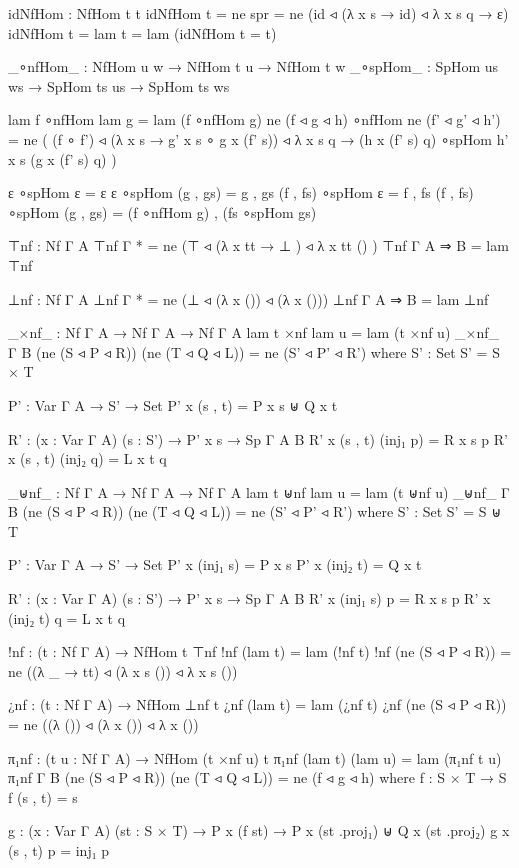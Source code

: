 \begin{code}
idNfHom : NfHom t t
idNfHom {t = ne spr} = ne (id ◃ (λ x s → id) ◃ λ x s q → ε)
idNfHom {t = lam t} = lam (idNfHom {t = t})

_∘nfHom_ : NfHom u w → NfHom t u → NfHom t w
_∘spHom_ : SpHom us ws → SpHom ts us → SpHom ts ws

lam f ∘nfHom lam g = lam (f ∘nfHom g)
ne (f ◃ g ◃ h) ∘nfHom ne (f' ◃ g' ◃ h') = ne (
  (f ∘ f')
  ◃ (λ x s → g' x s ∘ g x (f' s))
  ◃ λ x s q → (h x (f' s) q) ∘spHom h' x s (g x (f' s) q)
  )

ε ∘spHom ε = ε
ε ∘spHom (g , gs) = g , gs
(f , fs) ∘spHom ε = f , fs
(f , fs) ∘spHom (g , gs) = (f ∘nfHom g) , (fs ∘spHom gs)

⊤nf : Nf Γ A
⊤nf {Γ} {*} = ne (⊤ ◃ (λ{ x tt → ⊥ }) ◃ λ{ x tt () })
⊤nf {Γ} {A ⇒ B} = lam ⊤nf

⊥nf : Nf Γ A
⊥nf {Γ} {*} = ne (⊥ ◃ (λ x ()) ◃ (λ x ()))
⊥nf {Γ} {A ⇒ B} = lam ⊥nf

_×nf_ : Nf Γ A → Nf Γ A → Nf Γ A
lam t ×nf lam u = lam (t ×nf u)
_×nf_ {Γ} {B} (ne (S ◃ P ◃ R)) (ne (T ◃ Q ◃ L)) = ne (S' ◃ P' ◃ R')
  where
  S' : Set
  S' = S × T

  P' : Var Γ A → S' → Set
  P' x (s , t) = P x s ⊎ Q x t

  R' : (x : Var Γ A) (s : S') → P' x s → Sp Γ A B
  R' x (s , t) (inj₁ p) = R x s p
  R' x (s , t) (inj₂ q) = L x t q

_⊎nf_ : Nf Γ A → Nf Γ A → Nf Γ A
lam t ⊎nf lam u = lam (t ⊎nf u)
_⊎nf_ {Γ} {B} (ne (S ◃ P ◃ R)) (ne (T ◃ Q ◃ L)) = ne (S' ◃ P' ◃ R')
  where
  S' : Set
  S' = S ⊎ T

  P' : Var Γ A → S' → Set
  P' x (inj₁ s) = P x s
  P' x (inj₂ t) = Q x t

  R' : (x : Var Γ A) (s : S') → P' x s → Sp Γ A B
  R' x (inj₁ s) p = R x s p
  R' x (inj₂ t) q = L x t q

!nf : (t : Nf Γ A) → NfHom t ⊤nf
!nf (lam t) = lam (!nf t)
!nf (ne (S ◃ P ◃ R)) = ne ((λ _ → tt) ◃ (λ x s ()) ◃ λ x s ())

¿nf : (t : Nf Γ A) → NfHom ⊥nf t
¿nf (lam t) = lam (¿nf t)
¿nf (ne (S ◃ P ◃ R)) = ne ((λ ()) ◃ (λ x ()) ◃ λ x ())

π₁nf : (t u : Nf Γ A) → NfHom (t ×nf u) t
π₁nf (lam t) (lam u) = lam (π₁nf t u)
π₁nf {Γ} {B} (ne (S ◃ P ◃ R)) (ne (T ◃ Q ◃ L)) = ne (f ◃ g ◃ h)
  where
  f : S × T → S
  f (s , t) = s

  g : (x : Var Γ A) (st : S × T) → P x (f st) → P x (st .proj₁) ⊎ Q x (st .proj₂)
  g x (s , t) p = inj₁ p


\end{code}
